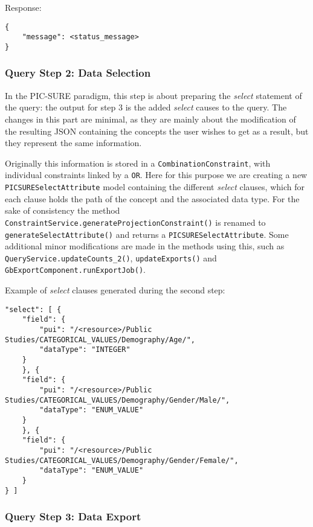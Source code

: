 Response:
\begin{verbatim}
{
    "message": <status_message>
} 
\end{verbatim}


\subsubsection{Query Step 2: Data Selection}

In the PIC-SURE paradigm, this step is about preparing the \emph{select} statement of the query: the output for step 3 is the added \emph{select} causes to the query.
The changes in this part are minimal, as they are mainly about the modification of the resulting JSON containing the concepts the user wishes to get as a result, but they represent the same information.

Originally this information is stored in a \verb|CombinationConstraint|, with individual constraints linked by a \verb|OR|.
Here for this purpose we are creating a new \verb|PICSURESelectAttribute| model containing the different \emph{select} clauses, which for each clause holds the path of the concept and the associated data type.
For the sake of consistency the method \verb|ConstraintService.generateProjectionConstraint()| is renamed to \verb|generateSelectAttribute()| and returns a \verb|PICSURESelectAttribute|.
Some additional minor modifications are made in the methods using this, such as \verb|QueryService.updateCounts_2()|, \verb|updateExports()| and \verb|GbExportComponent.runExportJob()|.

Example of \emph{select} clauses generated during the second step:
\begin{verbatim}
"select": [ {
    "field": {
        "pui": "/<resource>/Public Studies/CATEGORICAL_VALUES/Demography/Age/",
        "dataType": "INTEGER"
    }
    }, {
    "field": {
        "pui": "/<resource>/Public Studies/CATEGORICAL_VALUES/Demography/Gender/Male/",
        "dataType": "ENUM_VALUE"
    }
    }, {
    "field": {
        "pui": "/<resource>/Public Studies/CATEGORICAL_VALUES/Demography/Gender/Female/",
        "dataType": "ENUM_VALUE"
    }
} ]
\end{verbatim}


\subsubsection{Query Step 3:  Data Export}




